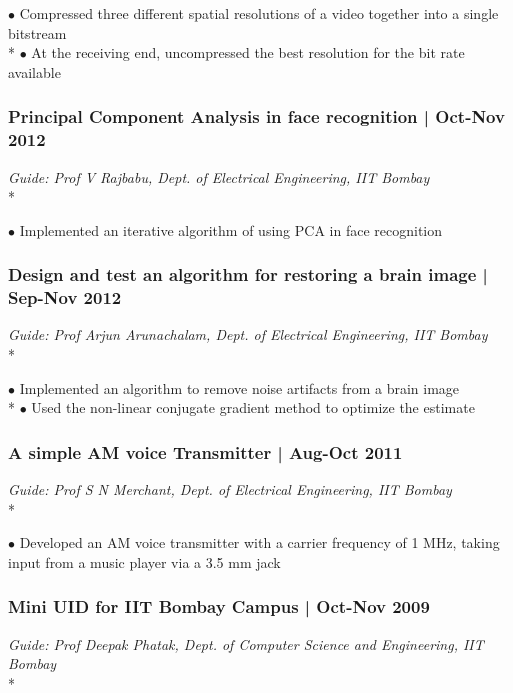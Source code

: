 \documentclass[12pt]{article}
\begin{document}
\noindent $\bullet$ Compressed three different spatial resolutions of a video together into a single bitstream \\*
$\bullet$ At the receiving end, uncompressed the best resolution for the bit rate available
 
\subsubsection*{Principal Component Analysis in face recognition | Oct-Nov 2012}

\emph{Guide: Prof V Rajbabu, Dept. of Electrical Engineering, IIT Bombay} \\*
  
\noindent$\bullet$ Implemented an iterative algorithm of using PCA in face recognition
 

\subsubsection*{Design and test an algorithm for restoring a brain image | Sep-Nov 2012} 

\emph{Guide: Prof Arjun Arunachalam, Dept. of Electrical Engineering, IIT Bombay} \\*
  
\noindent $\bullet$ Implemented an algorithm to remove noise artifacts from a brain image \\*
$\bullet$ Used the non-linear conjugate gradient method to optimize the estimate
 

\subsubsection*{A simple AM voice Transmitter | Aug-Oct 2011} 

\emph{Guide: Prof S N Merchant, Dept. of Electrical Engineering, IIT Bombay} \\*
  
\noindent $\bullet$ Developed an AM voice transmitter with a carrier frequency of 1 MHz, taking input from a music player via a 3.5 mm jack
 

\subsubsection*{Mini UID for IIT Bombay Campus | Oct-Nov 2009} 

\emph{Guide: Prof Deepak Phatak, Dept. of Computer Science and Engineering, IIT Bombay}\\*
  
\end{document}
